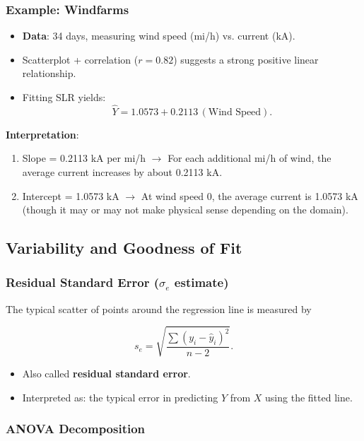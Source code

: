 \documentclass[10pt, total={6in, 8in}]{extarticle}
\begin{document}
\subsubsection{Example: Windfarms}

\begin{itemize}
    \item \textbf{Data}: 34 days, measuring wind speed (mi/h) vs. current (kA).
    \item Scatterplot + correlation ($r=0.82$) suggests a strong positive linear relationship.
    \item Fitting SLR yields:
          \[
              \hat{Y} = 1.0573 + 0.2113\,(\text{Wind Speed}).
          \]
\end{itemize}

\textbf{Interpretation}:
\begin{enumerate}
    \item Slope = 0.2113 kA per mi/h $\rightarrow$ For each additional mi/h of wind, the average current increases by about 0.2113 kA.
    \item Intercept = 1.0573 kA $\rightarrow$ At wind speed 0, the average current is 1.0573 kA (though it may or may not make physical sense depending on the domain).
\end{enumerate}



\subsection{Variability and Goodness of Fit}

\subsubsection{Residual Standard Error ($\sigma_e$ estimate)}

The typical scatter of points around the regression line is measured by

\[
    s_e = \sqrt{\frac{\sum (y_i - \hat{y}_i)^2}{n - 2}}.
\]

\begin{itemize}
    \item Also called \textbf{residual standard error}.
    \item Interpreted as: the typical error in predicting $Y$ from $X$ using the fitted line.
\end{itemize}

\subsubsection{ANOVA Decomposition}
\end{document}
